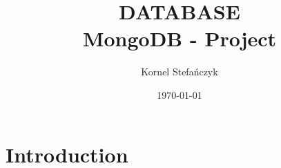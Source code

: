 


\title{DATABASE\\ \large{MongoDB - Project}}
\author{Kornel Stefańczyk}
\date{\today}



\maketitle

\section{Introduction}


